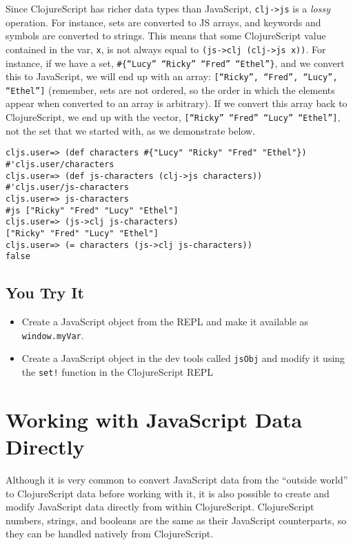 \documentclass[10pt,twoside,openright]{memoir}
\begin{document}
\begin{notice}[title={Lossy Conversions}]
Since ClojureScript has richer data types than JavaScript,
\texttt{clj-\textgreater{}js} is a \emph{lossy} operation. For instance, sets are
converted to JS arrays, and keywords and symbols are converted to
strings. This means that some ClojureScript value contained in the var,
\texttt{x}, is not always equal to \texttt{(js-\textgreater{}clj (clj-\textgreater{}js x))}.
For instance, if we have a set, \texttt{\#\{``Lucy'' ``Ricky'' ``Fred'' ``Ethel''\}},
and we convert this to JavaScript, we will end up with an
array: \texttt{{[}``Ricky'', ``Fred'', ``Lucy'', ``Ethel''{]}} (remember, sets
are not ordered, so the order in which the elements appear when
converted to an array is arbitrary). If we convert this array back to
ClojureScript, we end up with the vector, \texttt{{[}``Ricky'' ``Fred'' ``Lucy''
``Ethel''{]}}, not the set that we started with, as we demonstrate below.

\begin{verbatim}
cljs.user=> (def characters #{"Lucy" "Ricky" "Fred" "Ethel"})
#'cljs.user/characters
cljs.user=> (def js-characters (clj->js characters))
#'cljs.user/js-characters
cljs.user=> js-characters
#js ["Ricky" "Fred" "Lucy" "Ethel"]
cljs.user=> (js->clj js-characters)
["Ricky" "Fred" "Lucy" "Ethel"]
cljs.user=> (= characters (js->clj js-characters))
false
\end{verbatim}
\end{notice}

\subsection{You Try It}

\begin{itemize}
\tightlist
\item
  Create a JavaScript object from the REPL and make it available as
  \texttt{window.myVar}.
\item
  Create a JavaScript object in the dev tools called \texttt{jsObj} and
  modify it using the \texttt{set!} function in the ClojureScript REPL
\end{itemize}


\section{Working with JavaScript Data Directly}

Although it is very common to convert JavaScript data from the ``outside
world'' to ClojureScript data before working with it, it is also
possible to create and modify JavaScript data directly from within
ClojureScript. ClojureScript numbers, strings, and booleans are the same
as their JavaScript counterparts, so they can be handled natively from
ClojureScript.
\end{document}
